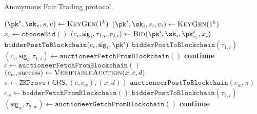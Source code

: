 \begin{algorithm}
    \caption{Anonymous Fair Trading protocol.}
    \label{alg:protocol}
    \begin{algorithmic}[1]
        \State $(\pk^v, \sk_v, s, v) \gets \text{\textsc{KeyGen}}(1^k)$
            \State $(\pk^i, \sk_i, s_i, v_i) \gets \text{\textsc{KeyGen}}(1^k)$
        \EndFor
            \State $x_i \gets \mathtt{chooseBid}()$
            \State $(c_i, \mathsf{sig}_i, \tau_{1,i}, \tau_{2,i}) \gets \text{\textsc{Bid}}(\pk^i, \sk_i, \pk^i_{v_i}, x_i)$
            \State $\mathtt{bidderPostToBlockchain}(c_i, \mathsf{sig}_i, \pk^i)$
        \EndFor
            \State $\mathtt{bidderPostToBlockchain}(\tau_{1,i})$
        \EndFor
            \State $(c_i, \mathsf{sig}_i, \tau_{1,i}) \gets \mathtt{auctioneerFetchFromBlockchain}()$
                \State \textbf{continue}
            \EndIf
        \EndFor
        \State $c \gets \mathtt{auctioneerFetchFromBlockchain}()$
        \State $(c_w, \text{success}) \gets \text{\textsc{VerifiableAuction}}(x, c, d)$
        \State $\pi \gets \mathtt{ZKProve}(\mathsf{CRS}, (c, c_w), (x, d))$
        \State $\mathtt{auctioneerPostToBlockchain}(c_w, \pi)$
            \State $c_w \gets \mathtt{bidderFetchFromBlockchain}()$
                \State $\mathtt{bidderPostToBlockchain}(\tau_{2,i})$
            \EndIf
        \EndFor
        \State $(\mathsf{sig}_w, \tau_{2,w}) \gets \mathtt{auctioneerGetchFromBlockchain}()$
        \State \textbf{continue}
        \EndIf
    \end{algorithmic}
\end{algorithm}